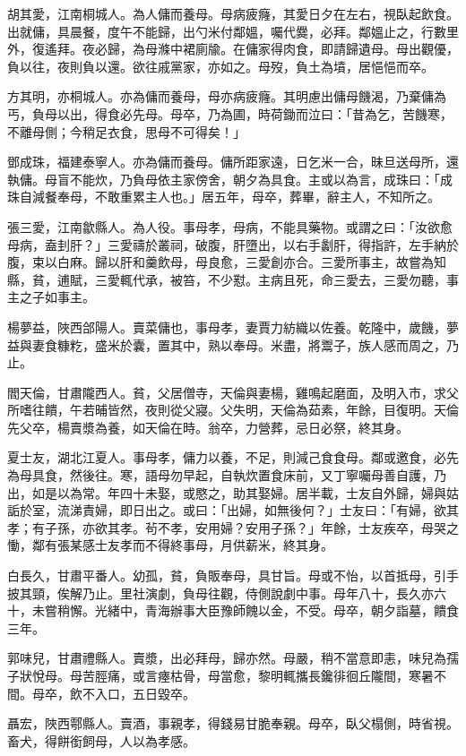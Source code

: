 \begin{pinyinscope}
胡其愛，江南桐城人。為人傭而養母。母病疲癃，其愛日夕在左右，視臥起飲食。出就傭，具晨餐，度午不能歸，出勺米付鄰媼，囑代爨，必拜。鄰媼止之，行數里外，復遙拜。夜必歸，為母滌中裙廁牏。在傭家得肉食，即請歸遺母。母出觀優，負以往，夜則負以還。欲往戚黨家，亦如之。母歿，負土為墳，居悒悒而卒。

方其明，亦桐城人。亦為傭而養母，母亦病疲癃。其明慮出傭母饑渴，乃棄傭為丐，負母以出，得食必先母。母卒，乃為圃，時荷鋤而泣曰：「昔為乞，苦饑寒，不離母側；今稍足衣食，思母不可得矣！」

鄧成珠，福建泰寧人。亦為傭而養母。傭所距家遠，日乞米一合，昧旦送母所，還執傭。母盲不能炊，乃負母依主家傍舍，朝夕為具食。主或以為言，成珠曰：「成珠自減餐奉母，不敢重累主人也。」居五年，母卒，葬畢，辭主人，不知所之。

張三愛，江南歙縣人。為人役。事母孝，母病，不能具藥物。或謂之曰：「汝欲愈母病，盍刲肝？」三愛禱於叢祠，破腹，肝墮出，以右手劙肝，得指許，左手納於腹，束以白麻。歸以肝和羹飲母，母良愈，三愛創亦合。三愛所事主，故嘗為知縣，貧，逋賦，三愛輒代承，被笞，不少懟。主病且死，命三愛去，三愛勿聽，事主之子如事主。

楊夢益，陜西郃陽人。賣菜傭也，事母孝，妻賈力紡織以佐養。乾隆中，歲饑，夢益與妻食糠籺，盛米於囊，置其中，熟以奉母。米盡，將鬻子，族人感而周之，乃止。

閻天倫，甘肅隴西人。貧，父居僧寺，天倫與妻楊，雞鳴起磨面，及明入市，求父所嗜往饋，午若晡皆然，夜則從父寢。父失明，天倫為茹素，年餘，目復明。天倫先父卒，楊賣漿為養，如天倫在時。翁卒，力營葬，忌日必祭，終其身。

夏士友，湖北江夏人。事母孝，傭力以養，不足，則減己食食母。鄰或邀食，必先為母具食，然後往。寒，語母勿早起，自執炊置食床前，又丁寧囑母善自護，乃出，如是以為常。年四十未娶，或愍之，助其娶婦。居半載，士友自外歸，婦與姑詬於室，流涕責婦，即日出之。或曰：「出婦，如無後何？」士友曰：「有婦，欲其孝；有子孫，亦欲其孝。茍不孝，安用婦？安用子孫？」年餘，士友疾卒，母哭之慟，鄰有張某感士友孝而不得終事母，月供薪米，終其身。

白長久，甘肅平番人。幼孤，貧，負販奉母，具甘旨。母或不怡，以首抵母，引手披其頸，俟解乃止。里社演劇，負母往觀，侍側說劇中事。母年八十，長久亦六十，未嘗稍懈。光緒中，青海辦事大臣豫師餽以金，不受。母卒，朝夕詣墓，饋食三年。

郭味兒，甘肅禮縣人。賣漿，出必拜母，歸亦然。母嚴，稍不當意即恚，味兒為孺子狀悅母。母苦脛痛，或言瘞枯骨，母當愈，黎明輒攜長鑱徘徊丘隴間，寒暑不間。母卒，飲不入口，五日毀卒。

聶宏，陜西鄠縣人。賣酒，事親孝，得錢易甘脆奉親。母卒，臥父榻側，時省視。畜犬，得餅銜飼母，人以為孝感。


\end{pinyinscope}
